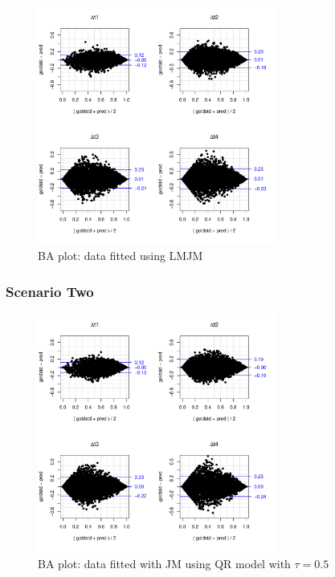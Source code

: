 \documentclass{article}
\begin{document}
\begin{figure}[H]
\centering
\includegraphics[width=0.7\textwidth]{qt25data_normpred_more.pdf}
\caption{BA plot: data fitted using LMJM}
\end{figure}



\subsubsection*{Scenario Two}
\begin{figure}[H]
\centering
\includegraphics[width=0.7\textwidth]{qt50data_qt50pred_more.pdf}
\caption{BA plot: data fitted with JM using QR model with $\tau=0.5$}
\end{figure}
\end{document}

